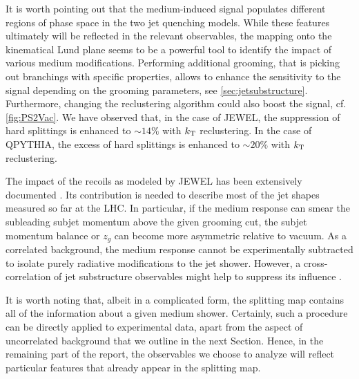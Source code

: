 It is worth pointing out that the medium-induced signal populates different regions of phase space in the two jet quenching models. 
While these features ultimately will be reflected in the relevant observables, the mapping onto the kinematical Lund plane seems to be a powerful tool to identify the impact of various medium modifications. Performing additional grooming, that is picking out branchings with specific properties, allows to enhance the sensitivity to the signal depending on the grooming parameters, see \autoref{sec:jetsubstructure}. Furthermore, changing the reclustering algorithm could also boost the signal, cf. \autoref{fig:PS2Vac}.
We have observed that, in the case of JEWEL, the suppression of hard splittings is enhanced to $\sim 14\%$ with $k_{\rm \tiny T}$ reclustering. In the case of QPYTHIA, the excess of hard splittings is enhanced to $\sim 20\%$ with $k_{\rm \tiny T}$ reclustering.

The impact of the recoils as modeled by JEWEL has been extensively documented \cite{KunnawalkamElayavalli:2017hxo,Milhano:2017nzm}. Its contribution is needed to describe most of the jet shapes measured so far at the LHC. In particular, if the medium response can smear the subleading subjet momentum above the given grooming cut, the subjet momentum balance or $z_{g}$ can become more asymmetric relative to vacuum.   As a correlated background, the medium response cannot be experimentally subtracted to isolate purely radiative modifications to the jet shower. However, a cross-correlation of jet substructure observables might help to suppress its influence \cite{Milhano:2017nzm}.

It is worth noting that, albeit in a complicated form, the splitting map contains all of the information about a given medium shower. Certainly, such a procedure can be directly applied to experimental data, apart from the aspect of uncorrelated background that we outline in the next Section. Hence, in the remaining part of the report, the observables we choose to analyze will reflect particular features that already appear in the splitting map.


